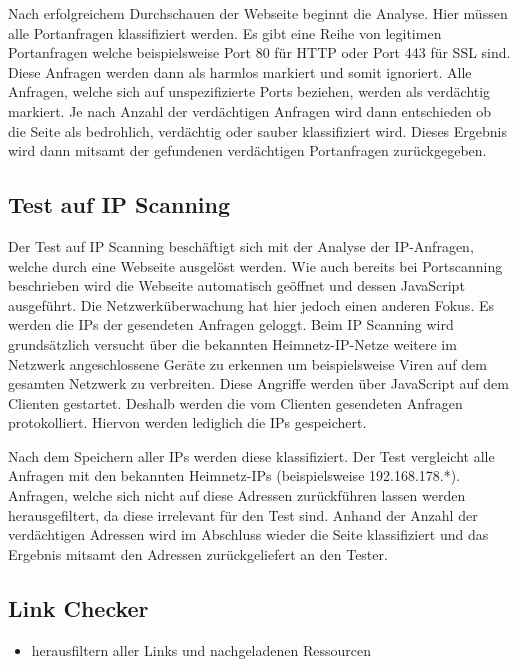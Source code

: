 Nach erfolgreichem Durchschauen der Webseite beginnt die Analyse. Hier müssen alle Portanfragen klassifiziert werden. Es gibt eine Reihe von legitimen Portanfragen welche beispielsweise Port 80 für HTTP oder Port 443 für SSL sind. Diese Anfragen werden dann als harmlos markiert und somit ignoriert. Alle Anfragen, welche sich auf unspezifizierte Ports beziehen, werden als verdächtig markiert. Je nach Anzahl der verdächtigen Anfragen wird dann entschieden ob die Seite als bedrohlich, verdächtig oder sauber klassifiziert wird. Dieses Ergebnis wird dann mitsamt der gefundenen verdächtigen Portanfragen zurückgegeben.

\subsection{Test auf IP Scanning}
Der Test auf IP Scanning beschäftigt sich mit der Analyse der IP-Anfragen, welche durch eine Webseite ausgelöst werden. Wie auch bereits bei Portscanning beschrieben wird die Webseite automatisch geöffnet und dessen JavaScript ausgeführt. Die Netzwerküberwachung hat hier jedoch einen anderen Fokus. Es werden die IPs der gesendeten Anfragen geloggt. Beim IP Scanning wird grundsätzlich versucht über die bekannten Heimnetz-IP-Netze weitere im Netzwerk angeschlossene Geräte zu erkennen um beispielsweise Viren auf dem gesamten Netzwerk zu verbreiten. Diese Angriffe werden über JavaScript auf dem Clienten gestartet. Deshalb werden die vom Clienten gesendeten Anfragen protokolliert. Hiervon werden lediglich die IPs gespeichert.

Nach dem Speichern aller IPs werden diese klassifiziert. Der Test vergleicht alle Anfragen mit den bekannten Heimnetz-IPs (beispielsweise 192.168.178.*). Anfragen, welche sich nicht auf diese Adressen zurückführen lassen werden herausgefiltert, da diese irrelevant für den Test sind. Anhand der Anzahl der verdächtigen Adressen wird im Abschluss wieder die Seite klassifiziert und das Ergebnis mitsamt den Adressen zurückgeliefert an den Tester.

\subsection{Link Checker}


\begin{itemize}
  \item herausfiltern aller Links und nachgeladenen Ressourcen
\end{itemize}

